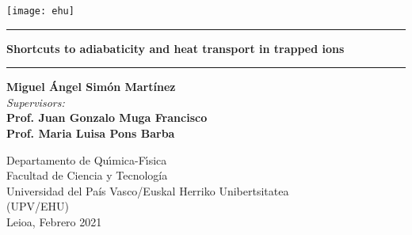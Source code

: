 \begin{titlepage}
\thispagestyle{empty} %
\hspace{-0.3cm}\texttt{[image: ehu]}\hspace{0.3cm}
\bigskip
{\centering \large
\par \vspace{1cm}

\hrule\vspace*{0.5cm}

{\LARGE \bf {Shortcuts to adiabaticity and heat transport in trapped ions}}

\vspace{0.7cm}\hrule \vspace{2.75cm}
{\LARGE \bf{Miguel \'{A}ngel Sim\'{o}n Mart\'{i}nez}}\\
\vspace{1.25cm}
{\it{Supervisors:}} \\
\vspace{0.1cm}
{\large \bf {Prof. Juan Gonzalo Muga Francisco}}\\
{\large \bf {Prof. Maria Luisa Pons Barba}}\\
\vspace{2.2cm}
\begin{figure}[h]
{\centering {

}\par}
\end{figure}
\vspace{1.0cm}
Departamento de Qu\'{\i}mica-F\'{\i}sica\\
Facultad de Ciencia y Tecnolog\'ia\\
Universidad del Pa\'is Vasco/Euskal Herriko Unibertsitatea\\ (UPV/EHU)\\
\vspace*{1.0cm}
\hspace{5.5cm}Leioa, Febrero 2021} \pagebreak
\end{titlepage}
